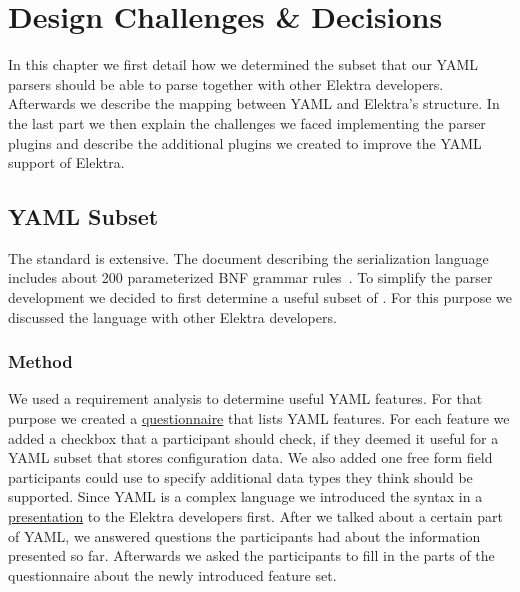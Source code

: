 \chapter{Design Challenges \& Decisions}
\label{sec:design_challenges_and_decisions}

In this chapter we first detail how we determined the subset that our YAML parsers should be able to parse together with other Elektra developers. Afterwards we describe the mapping between YAML and Elektra’s  structure. In the last part we then explain the challenges we faced implementing the parser plugins and describe the additional plugins we created to improve the YAML support of Elektra.

\section{YAML Subset}

The  standard is extensive. The document describing the serialization language includes about 200 parameterized \gls{BNF} grammar rules~\cite{ben2009yaml}. To simplify the parser development we decided to first determine a useful subset of . For this purpose we discussed the language with other Elektra developers.

\subsection{Method}

We used a requirement analysis to determine useful YAML features. For that purpose we created a \href{https://github.com/sanssecours/YAML-Presentation/blob/master/Questionnaire.md}{questionnaire} that lists YAML features. For each feature we added a checkbox that a participant should check, if they deemed it useful for a YAML subset that stores configuration data. We also added one free form field participants could use to specify additional data types they think should be supported. Since YAML is a complex language we introduced the  syntax in a \href{https://github.com/sanssecours/YAML-Presentation/releases/download/v1.0/Presentation.pdf}{presentation} to the Elektra developers first. After we talked about a certain part of YAML, we answered questions the participants had about the information presented so far. Afterwards we asked the participants to fill in the parts of the questionnaire about the newly introduced feature set.

